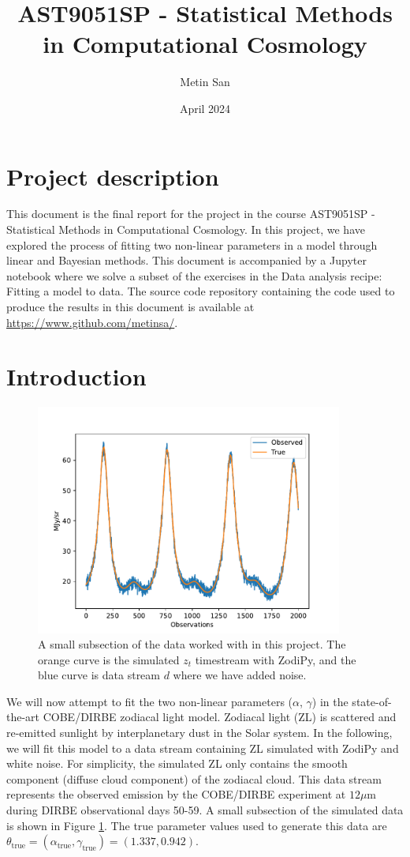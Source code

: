 \documentclass{article}
\title{AST9051SP - Statistical Methods in Computational Cosmology}
\author{Metin San}
\date{April 2024}
\begin{document}
\maketitle

\section*{Project description}
This document is the final report for the project in the course AST9051SP - Statistical Methods in Computational Cosmology.
In this project, we have explored the process of fitting two non-linear parameters in a model through linear and Bayesian methods.
This document is accompanied by a Jupyter notebook where we solve a subset of the exercises in the Data analysis recipe: Fitting a model to data\cite{hogg}. The source code repository containing the code used to produce the results in this document is available at \url{https://www.github.com/metinsa/}.


\section*{Introduction}
\begin{figure}[ht]
    \centering
    \includegraphics[width=0.9\textwidth]{figs/timestream.pdf}
    \caption{A small subsection of the data worked with in this project. The orange curve is the simulated $z_t$ timestream with ZodiPy, and the blue curve is data stream $d$ where we have added noise.}
    \label{fig:data}
\end{figure}
We will now attempt to fit the two non-linear parameters ($\alpha$, $\gamma$) in the state-of-the-art COBE/DIRBE zodiacal light model\cite{Kelsall1998}. Zodiacal light (ZL) is scattered and re-emitted sunlight by interplanetary dust in the Solar system. In the following, we will fit this model to a data stream containing ZL simulated with ZodiPy\cite{San2022, San2024} and white noise. For simplicity, the simulated ZL only contains the smooth component (diffuse cloud component) of the zodiacal cloud. This data stream represents the observed emission by the COBE/DIRBE experiment at $12 \mu$m during DIRBE observational days 50-59. A small subsection of the simulated data is shown in Figure \ref{fig:data}. The true parameter values used to generate this data are $\theta_\mathrm{true} = (\alpha_\mathrm{true}, \gamma_\mathrm{true}) = (1.337, 0.942)$.
\end{document}
